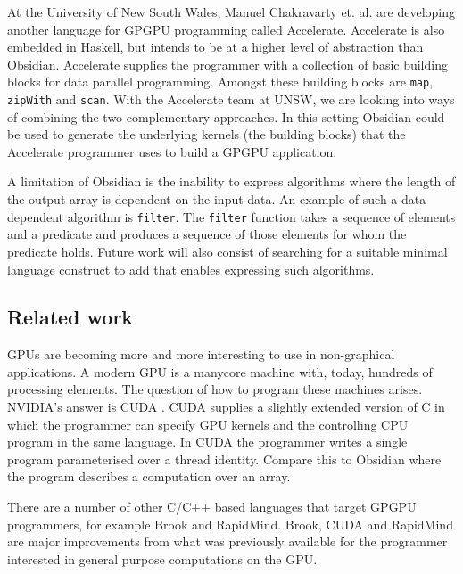 At the University of New South Wales, Manuel Chakravarty 
et. al. are developing another language for GPGPU programming
called Accelerate. Accelerate is also embedded in Haskell, but intends
to be at a higher 
level of abstraction than Obsidian. Accelerate supplies the programmer 
with a collection of basic building blocks for data parallel programming. 
Amongst these building blocks are {\tt map}, {\tt zipWith} and {\tt scan}.
With the Accelerate team at UNSW, we are looking into 
ways of combining the two complementary approaches. In this setting Obsidian 
could be used to generate the underlying kernels (the building blocks) that the Accelerate 
programmer uses to build a GPGPU application. 

A limitation of Obsidian is the inability to express algorithms where 
the length of the output array is dependent on the input data. 
An example of such a data dependent algorithm is {\tt filter}. The {\tt filter} 
function takes a sequence of elements and a predicate and produces a sequence 
of those elements for whom the predicate holds. Future work 
will also consist of searching for a suitable minimal language construct
to add that enables expressing such algorithms. 






\subsection{Related work}

GPUs are becoming more and more interesting to use in non-graphical applications.
A modern GPU is a manycore machine with, today, hundreds of processing elements. 
The question of how to program these machines arises. NVIDIA's answer is CUDA
. CUDA supplies a slightly extended version of C in which 
the programmer can specify GPU kernels and the controlling CPU program in the 
same language. In CUDA the programmer writes a single program parameterised 
over a thread identity. Compare this to Obsidian where the program describes 
a computation over an array. 

There are a number of other C/C++ based languages that target 
GPGPU programmers, for example Brook and 
RapidMind. Brook, CUDA and RapidMind are major improvements from 
what was previously available for the programmer interested in general purpose 
computations on the GPU. 

